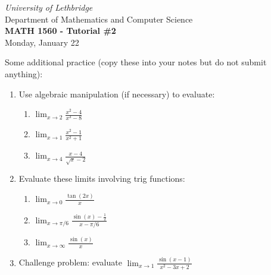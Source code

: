 \documentclass[12pt]{article}
\newcommand{\skipline}{\vspace{12pt}}
\newcommand{\di}{\displaystyle}
\begin{document}
\author{Instructor: Sean Fitzpatrick}
\thispagestyle{empty}
\begin{center}
\emph{University of Lethbridge}\\
Department of Mathematics and Computer Science\\
{\bf MATH 1560 - Tutorial \#2}\\
Monday, January 22
\end{center}
\skipline \skipline \skipline \noindent \skipline

\vspace*{\fill}



Some additional practice (copy these into your notes but do not submit anything):
\begin{enumerate}
\item Use algebraic manipulation (if necessary) to evaluate:
\begin{multicols}{3}
\begin{enumerate}
\item $\di\lim_{x\to 2}\frac{x^2-4}{x^3-8}$
\item $\di\lim_{x\to 1}\frac{x^2-1}{x^2+1}$
\item $\di\lim_{x\to 4}\frac{x-4}{\sqrt{x}-2}$
\end{enumerate}
\end{multicols}

\item Evaluate these limits involving trig functions:
\begin{multicols}{3}
\begin{enumerate}
\item $\di\lim_{x\to 0}\frac{\tan(2x)}{x}$
\item $\di\lim_{x\to \pi/6}\frac{\sin(x)-\frac12}{x-\pi/6}$
\item $\di\lim_{x\to \infty}\frac{\sin(x)}{x}$
\end{enumerate}
\end{multicols}
\item Challenge problem: evaluate $\di\lim_{x\to 1}\frac{\sin(x-1)}{x^2-3x+2}$
\end{enumerate}




\newpage
\end{document}
